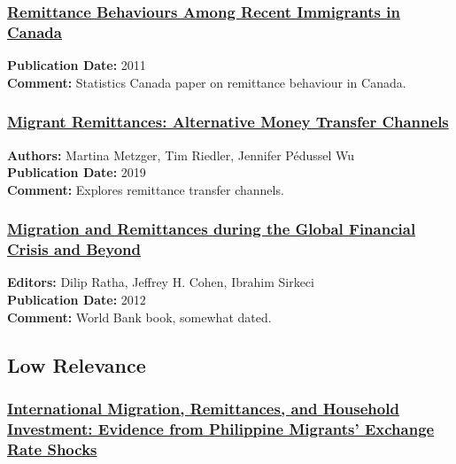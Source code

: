 \documentclass[
  11pt,
]{article}
\begin{document}
\subsubsection{\texorpdfstring{\href{https://www.statcan.gc.ca/en/catalogue/11-008-X201100211619}{Remittance
Behaviours Among Recent Immigrants in
Canada}}{Remittance Behaviours Among Recent Immigrants in Canada}}\label{remittance-behaviours-among-recent-immigrants-in-canada}

\textbf{Publication Date:} 2011\\
\textbf{Comment:} Statistics Canada paper on remittance behaviour in
Canada.

\subsubsection{\texorpdfstring{\href{https://www.econstor.eu/handle/10419/204586}{Migrant
Remittances: Alternative Money Transfer
Channels}}{Migrant Remittances: Alternative Money Transfer Channels}}\label{migrant-remittances-alternative-money-transfer-channels}

\textbf{Authors:} Martina Metzger, Tim Riedler, Jennifer Pédussel Wu\\
\textbf{Publication Date:} 2019\\
\textbf{Comment:} Explores remittance transfer channels.

\subsubsection{\texorpdfstring{\href{https://documents1.worldbank.org/curated/en/701621468149081927/pdf/693130PUB0publ067926B09780821388266.pdf}{Migration
and Remittances during the Global Financial Crisis and
Beyond}}{Migration and Remittances during the Global Financial Crisis and Beyond}}\label{migration-and-remittances-during-the-global-financial-crisis-and-beyond}

\textbf{Editors:} Dilip Ratha, Jeffrey H. Cohen, Ibrahim Sirkeci\\
\textbf{Publication Date:} 2012\\
\textbf{Comment:} World Bank book, somewhat dated.

\subsection{Low Relevance}\label{low-relevance}

\subsubsection{\texorpdfstring{\href{http://www.nber.org/papers/w12325}{International
Migration, Remittances, and Household Investment: Evidence from
Philippine Migrants' Exchange Rate
Shocks}}{International Migration, Remittances, and Household Investment: Evidence from Philippine Migrants' Exchange Rate Shocks}}\label{international-migration-remittances-and-household-investment-evidence-from-philippine-migrants-exchange-rate-shocks}
\end{document}
